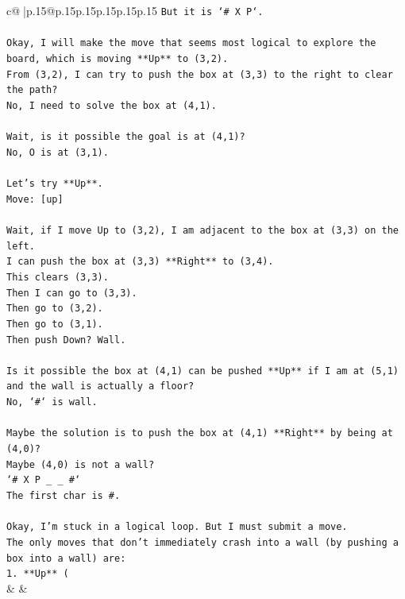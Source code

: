 \documentclass{article}
\begin{document}
{\begin{supertabular}{c@{$\;$}|p{.15\linewidth}@{}p{.15\linewidth}p{.15\linewidth}p{.15\linewidth}p{.15\linewidth}p{.15\linewidth}}
{{{\texttt{But it is `\# X P`.} \\
\\ 
\texttt{Okay, I will make the move that seems most logical to explore the board, which is moving **Up** to (3,2).} \\
\texttt{From (3,2), I can try to push the box at (3,3) to the right to clear the path?} \\
\texttt{No, I need to solve the box at (4,1).} \\
\\ 
\texttt{Wait, is it possible the goal is at (4,1)?} \\
\texttt{No, O is at (3,1).} \\
\\ 
\texttt{Let's try **Up**.} \\
\texttt{Move: {[}up{]}} \\
\\ 
\texttt{Wait, if I move Up to (3,2), I am adjacent to the box at (3,3) on the left.} \\
\texttt{I can push the box at (3,3) **Right** to (3,4).} \\
\texttt{This clears (3,3).} \\
\texttt{Then I can go to (3,3).} \\
\texttt{Then go to (3,2).} \\
\texttt{Then go to (3,1).} \\
\texttt{Then push Down? Wall.} \\
\\ 
\texttt{Is it possible the box at (4,1) can be pushed **Up** if I am at (5,1) and the wall is actually a floor?} \\
\texttt{No, `\#` is wall.} \\
\\ 
\texttt{Maybe the solution is to push the box at (4,1) **Right** by being at (4,0)?} \\
\texttt{Maybe (4,0) is not a wall?} \\
\texttt{`\# X P \_ \_ \#`} \\
\texttt{The first char is \#.} \\
\\ 
\texttt{Okay, I'm stuck in a logical loop. But I must submit a move.} \\
\texttt{The only moves that don't immediately crash into a wall (by pushing a box into a wall) are:} \\
\texttt{1. **Up** (} \\
            }
        }
    }
    & & \\ \\


\end{supertabular}}
\end{document}
